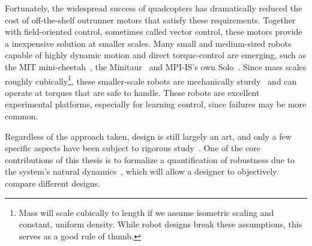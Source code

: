 Fortunately, the widespread success of quadcopters has dramatically reduced the cost of off-the-shelf outrunner motors that satisfy these requirements. Together with field-oriented control, sometimes called vector control, these motors provide a inexpensive solution at smaller scales. Many small and medium-sized robots capable of highly dynamic motion and direct torque-control are emerging, such as the MIT mini-cheetah~\cite{katz2019mini}, the Minitaur~\cite{kenneally2016design} and MPI-IS's own Solo~\cite{grimminger2019open}. Since mass scales roughly cubically\footnote{Mass will scale cubically to length if we assume isometric scaling and constant, uniform density. While robot designs break these assumptions, this serves as a good rule of thumb.}, these smaller-scale robots are mechanically sturdy~\cite{biewener2005biomechanical} and can operate at torques that are safe to handle. These robots are excellent experimental platforms, especially for learning control, since failures may be more common. \par
Regardless of the approach taken, design is still largely an art, and only a few specific aspects have been subject to rigorous study~\cite{abate2015passive,abate2016antagonism}. One of the core contributions of this thesis is to formalize a quantification of robustness due to the system's natural dynamics~\cite{heim2019beyond}, which will allow a designer to objectively compare different designs.





